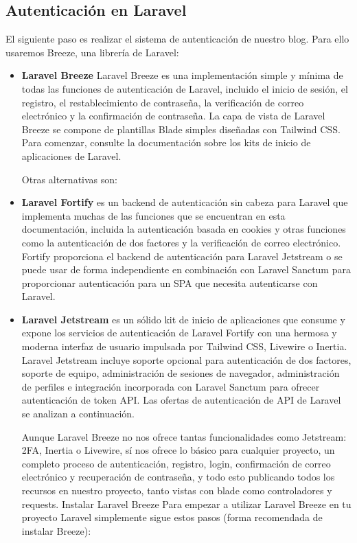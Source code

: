 \documentclass[11pt]{article}
\begin{document}
\subsection{Autenticación en Laravel}
\label{sec:org67a94cc}
El siguiente paso es realizar el sistema de autenticación de nuestro
blog. Para ello usaremos Breeze, una librería de Laravel:

\begin{itemize}
\item \textbf{Laravel Breeze}
\label{sec:org4bfdf81}
Laravel Breeze es una implementación simple y mínima de todas las
funciones de autenticación de Laravel, incluido el inicio de sesión,
el registro, el restablecimiento de contraseña, la verificación de
correo electrónico y la confirmación de contraseña. La capa de vista
de Laravel Breeze se compone de plantillas Blade simples diseñadas con
Tailwind CSS. Para comenzar, consulte la documentación sobre los kits
de inicio de aplicaciones de Laravel.

Otras alternativas son:
\item \textbf{Laravel Fortify} es un backend de autenticación sin cabeza para Laravel
\label{sec:orgc2a5bf0}
que implementa muchas de las funciones que se encuentran en esta
documentación, incluida la autenticación basada en cookies y otras
funciones como la autenticación de dos factores y la verificación de
correo electrónico. Fortify proporciona el backend de autenticación
para Laravel Jetstream o se puede usar de forma independiente en
combinación con Laravel Sanctum para proporcionar autenticación para
un SPA que necesita autenticarse con Laravel.

\item \textbf{Laravel Jetstream} es un sólido kit de inicio de aplicaciones que
\label{sec:orge0ce7bb}
consume y expone los servicios de autenticación de Laravel Fortify con
una hermosa y moderna interfaz de usuario impulsada por Tailwind CSS,
Livewire o Inertia. Laravel Jetstream incluye soporte opcional para
autenticación de dos factores, soporte de equipo, administración de
sesiones de navegador, administración de perfiles e integración
incorporada con Laravel Sanctum para ofrecer autenticación de token
API. Las ofertas de autenticación de API de Laravel se analizan a
continuación.

Aunque Laravel Breeze no nos ofrece tantas funcionalidades como
Jetstream: 2FA, Inertia o Livewire, sí nos ofrece lo básico para
cualquier proyecto, un completo proceso de autenticación, registro,
login, confirmación de correo electrónico y recuperación de
contraseña, y todo esto publicando todos los recursos en nuestro
proyecto, tanto vistas con blade como controladores y
requests. Instalar Laravel Breeze Para empezar a utilizar Laravel
Breeze en tu proyecto Laravel simplemente sigue estos pasos (forma
recomendada de instalar Breeze):


\end{itemize}
\end{document}
